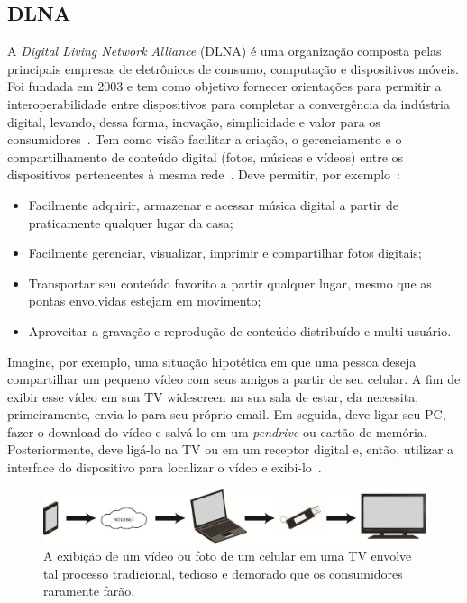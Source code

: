 \subsection{DLNA}

A \emph{Digital Living Network Alliance} (DLNA) é uma organização composta pelas principais empresas de eletrônicos de consumo, computação e dispositivos móveis. Foi fundada em 2003 e tem como objetivo fornecer orientações para permitir a interoperabilidade entre dispositivos para completar a convergência da indústria digital, levando, dessa forma, inovação, simplicidade e valor para os consumidores~\cite{dlnaoverview}. Tem como visão facilitar a criação, o gerenciamento e o compartilhamento de conteúdo digital (fotos, músicas e vídeos) entre os dispositivos pertencentes à mesma rede~\cite{dlnahdvideostreaming}. Deve permitir, por exemplo~\cite{dlnaoverview}:

\begin{itemize}
	\item Facilmente adquirir, armazenar e acessar música digital a partir de praticamente qualquer lugar da casa;
	\item Facilmente gerenciar, visualizar, imprimir e compartilhar fotos digitais;
	\item Transportar seu conteúdo favorito a partir qualquer lugar, mesmo que as pontas envolvidas estejam em movimento;
	\item Aproveitar a gravação e reprodução de conteúdo distribuído e multi-usuário.
\end{itemize}

Imagine, por exemplo, uma situação hipotética em que uma pessoa deseja compartilhar um pequeno vídeo com seus amigos a partir de seu celular. A fim de exibir esse vídeo em sua TV widescreen na sua sala de estar, ela necessita, primeiramente, envia-lo para seu próprio email. Em seguida, deve ligar seu PC, fazer o download do vídeo e salvá-lo em um \emph{pendrive} ou cartão de memória. Posteriormente, deve ligá-lo na TV ou em um receptor digital e, então, utilizar a interface do dispositivo para localizar o vídeo e exibi-lo~\cite{dlnahdvideostreaming}.

\begin{figure}[ht]
	\center
	\includegraphics[scale=0.3]{imagens/dlna1}
	\caption{A exibição de um vídeo ou foto de um celular em uma TV envolve tal processo tradicional, tedioso e demorado que os consumidores raramente farão.}
	\label{fig:traditionalProccess}
\end{figure}

